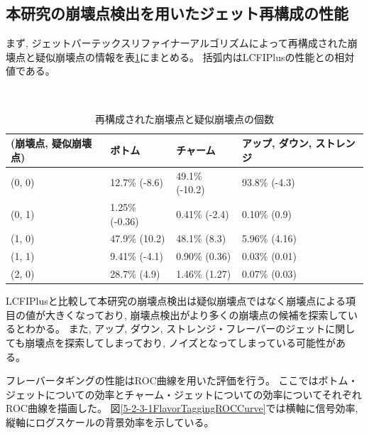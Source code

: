 \subsection{本研究の崩壊点検出を用いたジェット再構成の性能} \label{Com:FlaTagCom:PerformanceofFlavorTagging}

まず, ジェットバーテックスリファイナーアルゴリズムによって再構成された崩壊点と疑似崩壊点の情報を表\ref{TheNumberofReconstructedVertices}にまとめる。
括弧内はLCFIPlusの性能との相対値である。

\begin{table}[htb]
 \centering
　\small
  \begin{tabular}{l l l l}\hline
    (崩壊点, 疑似崩壊点) & ボトム & チャーム & アップ, ダウン, ストレンジ\\\hline\hline
    (0, 0) & 12.7\% (-8.6) & 49.1\% (-10.2) & 93.8\% (-4.3)\\
    (0, 1) & 1.25\% (-0.36) & 0.41\% (-2.4) & 0.10\% (0.9)\\
    (1, 0) & 47.9\% (10.2) & 48.1\% (8.3) & 5.96\% (4.16)\\
    (1, 1) & 9.41\% (-4.1) & 0.90\% (0.36) & 0.03\% (0.01)\\
    (2, 0) & 28.7\% (4.9) & 1.46\% (1.27) & 0.07\% (0.03)\\\hline
  \end{tabular}
  \caption{再構成された崩壊点と疑似崩壊点の個数}
  \label{TheNumberofReconstructedVertices}
\end{table}

LCFIPlusと比較して本研究の崩壊点検出は疑似崩壊点ではなく崩壊点による項目の値が大きくなっており, 崩壊点検出がより多くの崩壊点の候補を探索しているとわかる。
また, アップ, ダウン, ストレンジ・フレーバーのジェットに関しても崩壊点を探索してしまっており, ノイズとなってしまっている可能性がある。

フレーバータギングの性能はROC曲線を用いた評価を行う。
ここではボトム・ジェットについての効率とチャーム・ジェットについての効率についてそれぞれROC曲線を描画した。
図\ref{5-2-3-1FlavorTaggingROCCurve}では横軸に信号効率, 縦軸にログスケールの背景効率を示している。

